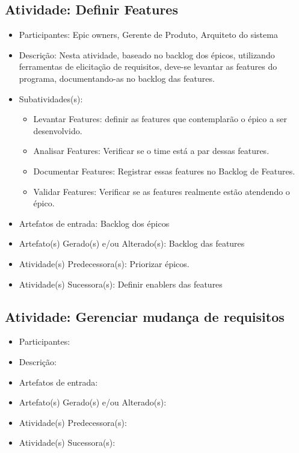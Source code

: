 
\subsection{Atividade: Definir Features}
\begin{itemize}
\item Participantes: Epic owners, Gerente de Produto, Arquiteto do sistema

\item Descrição: Nesta atividade, baseado no backlog dos épicos, utilizando ferramentas de elicitação de requisitos, deve-se levantar as features do programa, documentando-as no backlog das features.

\item Subatividades(s):
    \begin{itemize} 
    \item Levantar Features: definir as features que contemplarão o épico a ser desenvolvido.
    \item Analisar Features: Verificar se o time está a par dessas features.
    \item Documentar Features:  Registrar essas features no Backlog de Features.
    \item Validar Features: Verificar se as features realmente estão atendendo o épico.
    \end{itemize}

\item Artefatos de entrada: Backlog dos épicos

\item Artefato(s) Gerado(s) e/ou Alterado(s): Backlog das features

\item Atividade(s) Predecessora(s): Priorizar épicos.
  
\item Atividade(s) Sucessora(s): Definir enablers das features
\end{itemize}

\subsection{Atividade: Gerenciar mudança de requisitos}
\begin{itemize}
\item Participantes: 

\item Descrição: 

\item Artefatos de entrada: 

\item Artefato(s) Gerado(s) e/ou Alterado(s): 

\item Atividade(s) Predecessora(s): 
  
\item Atividade(s) Sucessora(s): 
\end{itemize}

